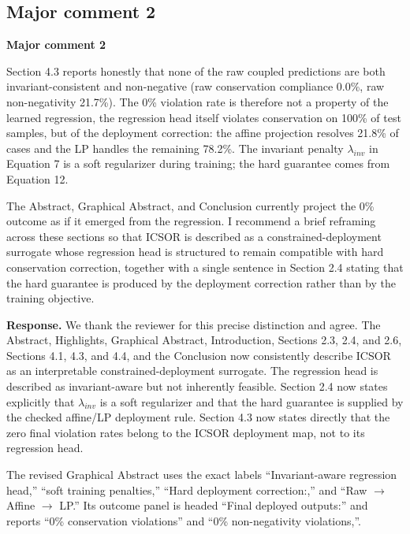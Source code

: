 \documentclass[11pt,a4paper]{article}
\begin{document}
\subsection*{Major comment 2}

\begin{reviewercomment}
\textbf{Major comment 2}

Section 4.3 reports honestly that none of the raw coupled predictions are both invariant-consistent and non-negative (raw conservation compliance 0.0\%, raw non-negativity 21.7\%). The 0\% violation rate is therefore not a property of the learned regression, the regression head itself violates conservation on 100\% of test samples, but of the deployment correction: the affine projection resolves 21.8\% of cases and the LP handles the remaining 78.2\%. The invariant penalty $\lambda_{inv}$ in Equation 7 is a soft regularizer during training; the hard guarantee comes from Equation 12.

The Abstract, Graphical Abstract, and Conclusion currently project the 0\% outcome as if it emerged from the regression. I recommend a brief reframing across these sections so that ICSOR is described as a constrained-deployment surrogate whose regression head is structured to remain compatible with hard conservation correction, together with a single sentence in Section 2.4 stating that the hard guarantee is produced by the deployment correction rather than by the training objective.
\end{reviewercomment}

\noindent\textbf{Response.} We thank the reviewer for this precise distinction and agree. The Abstract, Highlights, Graphical Abstract, Introduction, Sections 2.3, 2.4, and 2.6, Sections 4.1, 4.3, and 4.4, and the Conclusion now consistently describe ICSOR as an interpretable constrained-deployment surrogate. The regression head is described as invariant-aware but not inherently feasible. Section 2.4 now states explicitly that $\lambda_{inv}$ is a soft regularizer and that the hard guarantee is supplied by the checked affine/LP deployment rule. Section 4.3 now states directly that the zero final violation rates belong to the ICSOR deployment map, not to its regression head.

The revised Graphical Abstract uses the exact labels ``Invariant-aware regression head,'' ``soft training penalties,'' ``Hard deployment correction:,'' and ``Raw $\rightarrow$ Affine $\rightarrow$ LP.'' Its outcome panel is headed ``Final deployed outputs:'' and reports ``0\% conservation violations'' and ``0\% non-negativity violations,''.
\end{document}
